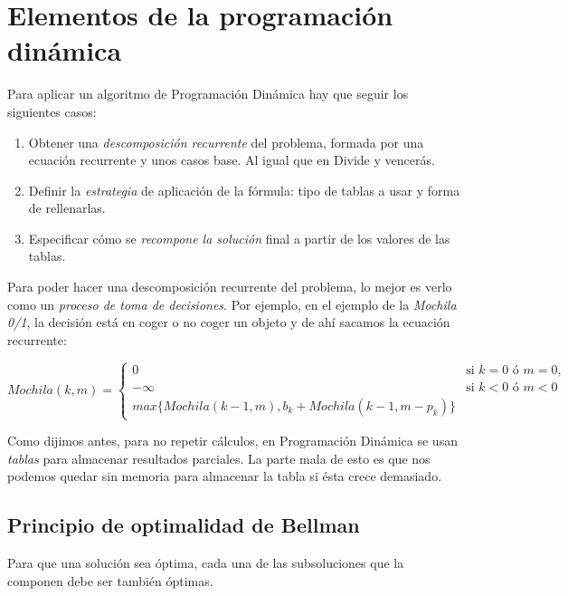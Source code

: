 \documentclass[10pt,a4paper,spanish]{report}
\theoremstyle{definition}
\theoremstyle{remark}
\begin{document}
\section{\textcolor{amethyst}Elementos de la programación dinámica}
Para aplicar un algoritmo de Programación Dinámica hay que seguir los siguientes casos:
\begin{enumerate}
    \item Obtener una \textit{\textcolor{amethyst}{descomposición recurrente}} del problema, formada por una ecuación recurrente y unos casos base. Al igual que en Divide y vencerás.
    \item Definir la \textit{\textcolor{amethyst}{estrategia}} de aplicación de la fórmula: tipo de tablas a usar y forma de rellenarlas.
    \item Especificar cómo se \textit{\textcolor{amethyst}{recompone la solución}} final a partir de los valores de las tablas.
\end{enumerate}

Para poder hacer una descomposición recurrente del problema, lo mejor es verlo como un \textit{\textcolor{amethyst}{proceso de toma de decisiones}}. Por ejemplo, en el ejemplo de la \textit{\textcolor{amethyst}{Mochila 0/1}}, la decisión está en coger o no coger un objeto y de ahí sacamos la ecuación recurrente:

\begin{equation*}
Mochila(k,m) = 
\begin{cases}
0 & \text{si } k = 0 \text{ ó } m = 0,\\
-\infty & \text{si } k<0 \text{ ó } m<0\\
max\{Mochila(k-1,m), b_k + Mochila(k-1,m-p_k)\}
\end{cases} 
\end{equation*}


Como dijimos antes, para no repetir cálculos, en Programación Dinámica se usan \textit{\textcolor{amethyst}{tablas}} para almacenar resultados parciales. La parte mala de esto es que nos podemos quedar sin memoria para almacenar la tabla si ésta crece demasiado.


\subsection{\textcolor{amethyst}Principio de optimalidad de Bellman}

Para que una solución sea óptima, cada una de las subsoluciones que la componen debe ser también óptimas.
\end{document}

